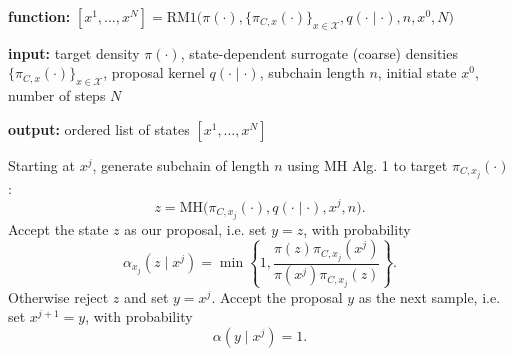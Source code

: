 \documentclass[12pt]{article}
\theoremstyle{definition}
\theoremstyle{remark}
\theoremstyle{plain}
\begin{document}
\begin{algorithm}[H]
  \caption{Rat-Mice 1.0 (RM1)}
  \label{alg:rm1}
  \textbf{function:} $[x^1,\ldots,x^N] =
  \mathrm{RM1}\bigl(\pi(\cdot), \{\pi_{C,x}(\cdot)\}_{x \in \mathcal{X}}, q(\cdot\mid\cdot), n, x^0, N\bigr)$
  
  \textbf{input:} target density $\pi(\cdot)$, state-dependent surrogate (coarse) densities $\{\pi_{C,x}(\cdot)\}_{x \in \mathcal{X}}$, 
  proposal kernel $q(\cdot\mid\cdot)$, subchain length $n$, initial state $x^0$, number of steps $N$
  
  \textbf{output:} ordered list of states $[x^1,\ldots,x^N]$
  
  \begin{algorithmic}[1]
      \State Starting at $x^j$, generate subchain of length $n$ using MH Alg. 1 to target $\pi_{C, x_j}(\cdot)$:
      \[
          z = \mathrm{MH}\bigl(\pi_{C, x_j}(\cdot), q(\cdot\mid\cdot), x^j, n\bigr).
      \]
      \State Accept the state $z$ as our proposal, i.e. set $y = z$, with probability
      \[
          \alpha_{x_j}(z \mid x^j)
          =
          \min\left\{
              1,
              \frac{\pi(z)\pi_{C, x_j}(x^j)}
                   {\pi(x^j)\pi_{C, x_j}(z)}
          \right\}.
      \]
      \State Otherwise reject $z$ and set $y = x^j$.
      \State Accept the proposal $y$ as the next sample, i.e. set $x^{j+1} = y$, with probability
      \[
          \alpha(y \mid x^j)
          = 1.
      \]
  \EndFor
  \end{algorithmic}
\end{algorithm}
\end{document}
